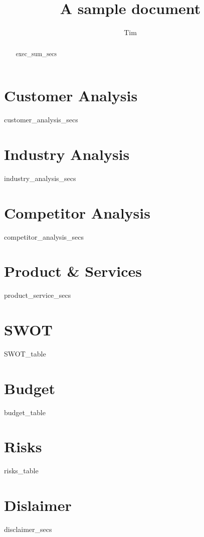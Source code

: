 \documentclass[11pt]{article}
\title{A sample document}
\author{Tim}
\begin{document}
\maketitle
\date

\newpage
\renewcommand{\abstractname}{Executive Summary}

\begin{abstract}
{{ exec_sum_secs }}
\end{abstract}

\newpage
\tableofcontents

\newpage{}
\section{Customer Analysis}
{{ customer_analysis_secs }}

\newpage{}
\section{Industry Analysis}
{{ industry_analysis_secs }}

\newpage{}
\section{Competitor Analysis}
{{ competitor_analysis_secs }}

\newpage{}
\section{Product \& Services}
{{ product_service_secs }}

\newpage{}
\section{SWOT}
{{ SWOT_table }}

\section{Budget}
{{ budget_table }}

\newpage{}
\section{Risks}
{{ risks_table }}

\newpage{}
\section{Dislaimer}
{{ disclaimer_secs }}
\end{document}
